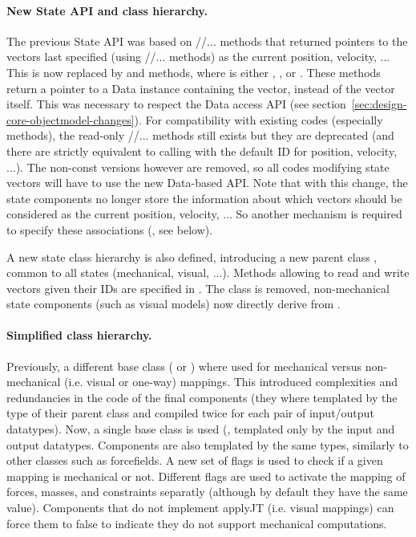 \begin{itemize}
\begin{itemize}
\paragraph{New State API and class hierarchy.}
The previous State API was based on //... methods that returned pointers to the vectors last specified (using //... methods) as the current position, velocity, ...
This is now replaced by  and  methods, where  is either , , or .
These methods return a pointer to a Data instance containing the vector, instead of the vector itself.
This was necessary to respect the Data access API (see section~\ref{sec:design-core-objectmodel-changes}).
For compatibility with existing codes (especially  methods), the read-only //... methods still exists but they are deprecated (and there are strictly equivalent to calling  with the default ID for position, velocity, ...).
The non-const versions however are removed, so all codes modifying state vectors will have to use the new Data-based API.
Note that with this change, the state components no longer store the information about which vectors should be considered as the current position, velocity, ...
So another mechanism is required to specify these associations (, see below).

A new state class hierarchy is also defined,  introducing a new parent class , common to all states (mechanical, visual, ...).
Methods allowing to read and write vectors given their IDs are specified in .
The  class is removed, non-mechanical state components (such as visual models) now directly derive from .


\paragraph{Simplified  class hierarchy.}
Previously, a different base class ( or ) where used for mechanical versus non-mechanical (i.e. visual or one-way) mappings.
This introduced complexities and redundancies in the code of the final components (they where templated by the type of their parent class and compiled twice for each pair of input/output datatypes).
Now, a single base class is used (, templated only by the input and output datatypes.
Components are also templated by the same types, similarly to other classes such as forcefields.
A new set of flags is used to check if a given mapping is mechanical or not.
Different flags are used to activate the mapping of forces, masses, and constraints separatly (although by default they have the same value).
Components that do not implement applyJT (i.e. visual mappings) can force them to false to indicate they do not support mechanical computations.


\end{itemize}
\end{itemize}
